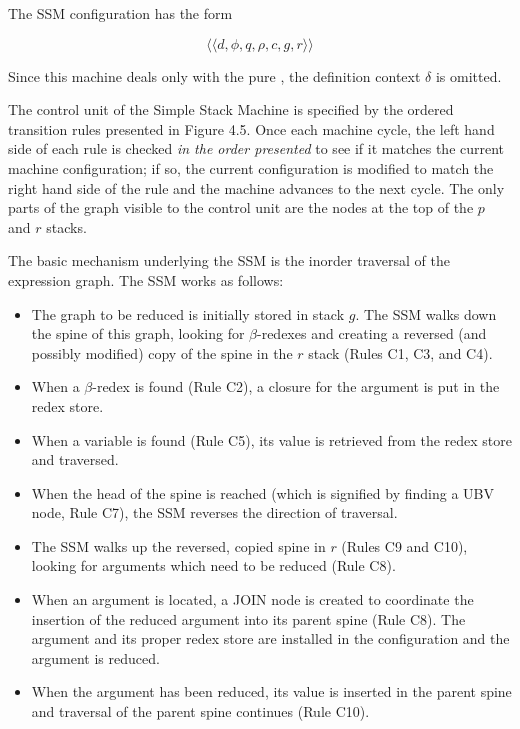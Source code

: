The SSM configuration has the form

\[
\langle\!\langle d,\phi,q,\rho,c,g,r\rangle\!\rangle
\]

Since this machine deals only with the pure \lambdacalculus{}, the definition
context \(\delta\) is omitted.

The control unit of the Simple Stack Machine is specified by the ordered transition rules presented in Figure 4.5. Once each machine cycle, the left hand side of each rule is checked \emph{in the order presented} to see if it matches the current machine configuration; if so, the current configuration is modified to match the right hand side of the rule and the machine advances to the next cycle. The only parts of the graph visible to the control unit are the nodes at the top of the \(p\) and \(r\) stacks.

The basic mechanism underlying the SSM is the inorder traversal of the expression
graph. The SSM works as follows:

\begin{itemize}
\item The graph to be reduced is initially stored in stack \(g\). The SSM walks
down the spine of this graph, looking for \(\beta\)-redexes and creating a
reversed (and possibly modified) copy of the spine in the \(r\) stack (Rules C1,
C3, and C4).
\item When a \(\beta\)-redex is found (Rule C2), a closure for the argument is put
in the redex store.
\item When a variable is found (Rule C5), its value is retrieved from the redex
store and traversed.
\item When the head of the spine is reached (which is signified by finding a UBV
node, Rule C7), the SSM reverses the direction of traversal.
\item The SSM walks up the reversed, copied spine in \(r\) (Rules C9 and C10),
looking for arguments which need to be reduced (Rule C8).
\item When an argument is located, a JOIN node is created to coordinate the
insertion of the reduced argument into its parent spine (Rule C8). The argument
and its proper redex store are installed in the configuration and the argument is
reduced.
\item When the argument has been reduced, its value is inserted in the parent
spine and traversal of the parent spine continues (Rule C10).
\end{itemize}


